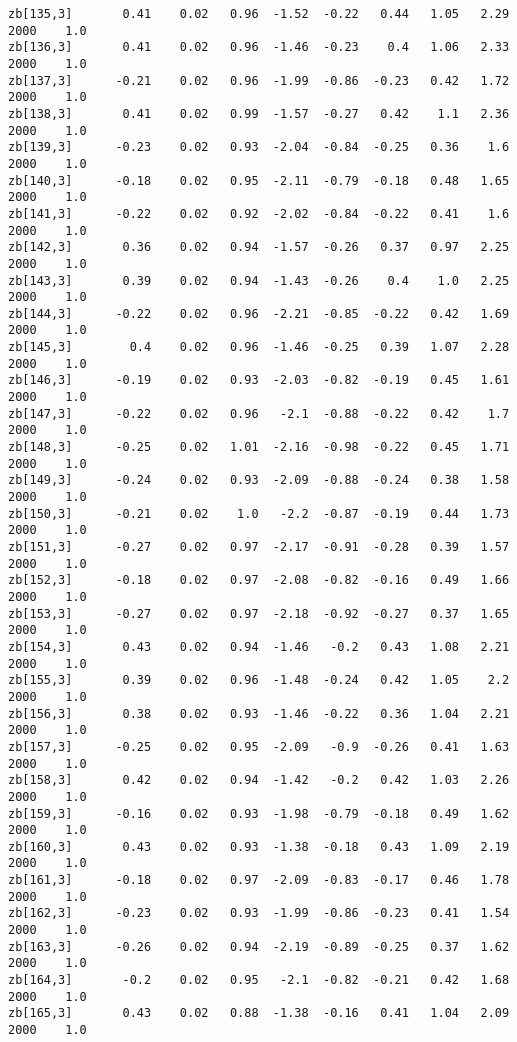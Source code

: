 \documentclass[11pt]{article}
\begin{document}
\begin{Verbatim}[commandchars=\\\{\}]
zb[135,3]       0.41    0.02   0.96  -1.52  -0.22   0.44   1.05   2.29   2000    1.0
zb[136,3]       0.41    0.02   0.96  -1.46  -0.23    0.4   1.06   2.33   2000    1.0
zb[137,3]      -0.21    0.02   0.96  -1.99  -0.86  -0.23   0.42   1.72   2000    1.0
zb[138,3]       0.41    0.02   0.99  -1.57  -0.27   0.42    1.1   2.36   2000    1.0
zb[139,3]      -0.23    0.02   0.93  -2.04  -0.84  -0.25   0.36    1.6   2000    1.0
zb[140,3]      -0.18    0.02   0.95  -2.11  -0.79  -0.18   0.48   1.65   2000    1.0
zb[141,3]      -0.22    0.02   0.92  -2.02  -0.84  -0.22   0.41    1.6   2000    1.0
zb[142,3]       0.36    0.02   0.94  -1.57  -0.26   0.37   0.97   2.25   2000    1.0
zb[143,3]       0.39    0.02   0.94  -1.43  -0.26    0.4    1.0   2.25   2000    1.0
zb[144,3]      -0.22    0.02   0.96  -2.21  -0.85  -0.22   0.42   1.69   2000    1.0
zb[145,3]        0.4    0.02   0.96  -1.46  -0.25   0.39   1.07   2.28   2000    1.0
zb[146,3]      -0.19    0.02   0.93  -2.03  -0.82  -0.19   0.45   1.61   2000    1.0
zb[147,3]      -0.22    0.02   0.96   -2.1  -0.88  -0.22   0.42    1.7   2000    1.0
zb[148,3]      -0.25    0.02   1.01  -2.16  -0.98  -0.22   0.45   1.71   2000    1.0
zb[149,3]      -0.24    0.02   0.93  -2.09  -0.88  -0.24   0.38   1.58   2000    1.0
zb[150,3]      -0.21    0.02    1.0   -2.2  -0.87  -0.19   0.44   1.73   2000    1.0
zb[151,3]      -0.27    0.02   0.97  -2.17  -0.91  -0.28   0.39   1.57   2000    1.0
zb[152,3]      -0.18    0.02   0.97  -2.08  -0.82  -0.16   0.49   1.66   2000    1.0
zb[153,3]      -0.27    0.02   0.97  -2.18  -0.92  -0.27   0.37   1.65   2000    1.0
zb[154,3]       0.43    0.02   0.94  -1.46   -0.2   0.43   1.08   2.21   2000    1.0
zb[155,3]       0.39    0.02   0.96  -1.48  -0.24   0.42   1.05    2.2   2000    1.0
zb[156,3]       0.38    0.02   0.93  -1.46  -0.22   0.36   1.04   2.21   2000    1.0
zb[157,3]      -0.25    0.02   0.95  -2.09   -0.9  -0.26   0.41   1.63   2000    1.0
zb[158,3]       0.42    0.02   0.94  -1.42   -0.2   0.42   1.03   2.26   2000    1.0
zb[159,3]      -0.16    0.02   0.93  -1.98  -0.79  -0.18   0.49   1.62   2000    1.0
zb[160,3]       0.43    0.02   0.93  -1.38  -0.18   0.43   1.09   2.19   2000    1.0
zb[161,3]      -0.18    0.02   0.97  -2.09  -0.83  -0.17   0.46   1.78   2000    1.0
zb[162,3]      -0.23    0.02   0.93  -1.99  -0.86  -0.23   0.41   1.54   2000    1.0
zb[163,3]      -0.26    0.02   0.94  -2.19  -0.89  -0.25   0.37   1.62   2000    1.0
zb[164,3]       -0.2    0.02   0.95   -2.1  -0.82  -0.21   0.42   1.68   2000    1.0
zb[165,3]       0.43    0.02   0.88  -1.38  -0.16   0.41   1.04   2.09   2000    1.0

\end{Verbatim}
\end{document}
